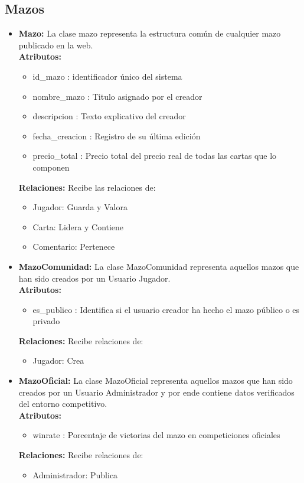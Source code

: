 \documentclass[10pt]{article}
\begin{document}
	\subsection{Mazos}
	\begin{itemize}
		\item \textbf{Mazo:} La clase mazo representa la estructura común de cualquier mazo publicado en la web.\\
		\textbf{Atributos:}
		\begin{itemize}
			\item id\_mazo : identificador único del sistema
			\item nombre\_mazo : Titulo asignado por el creador
			\item descripcion : Texto explicativo del creador
			\item fecha\_creacion : Registro de su última edición 
			\item precio\_total : Precio total del precio real de todas las cartas que lo componen
		\end{itemize}
		\textbf{Relaciones:}
		Recibe las relaciones de:
		\begin{itemize}
			\item Jugador: Guarda y Valora
			\item Carta: Lidera y Contiene
			\item Comentario: Pertenece 
		\end{itemize}
		
		\item \textbf{MazoComunidad:} La clase MazoComunidad representa aquellos mazos que han sido creados por un Usuario Jugador.\\
		\textbf{Atributos:}
		\begin{itemize}
			\item es\_publico : Identifica si el usuario creador ha hecho el mazo público o es privado
		\end{itemize}
		\textbf{Relaciones:}
		Recibe relaciones de:
		\begin{itemize}
			\item Jugador: Crea
		\end{itemize}
		
		\item \textbf{MazoOficial:} La clase MazoOficial representa aquellos mazos que han sido creados por un Usuario Administrador y por ende contiene datos verificados del entorno competitivo.\\
		\textbf{Atributos:}
		\begin{itemize}
			\item winrate : Porcentaje de victorias del mazo en competiciones oficiales
		\end{itemize}
		\textbf{Relaciones:}
		Recibe relaciones de:
		\begin{itemize}
			\item Administrador: Publica
		\end{itemize}
		

\end{itemize}
\end{document}

